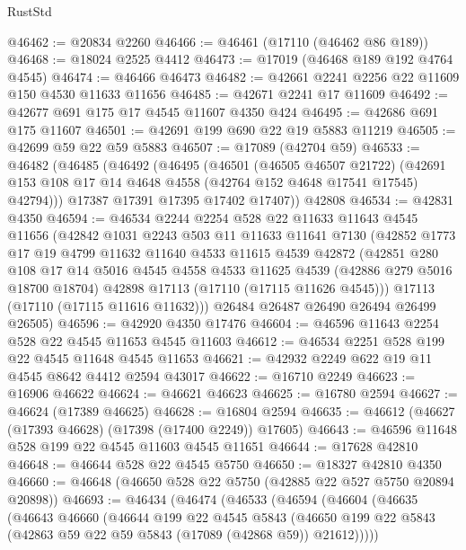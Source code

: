 \begin{lexlean}{RustStd}
\begin{coremodule}
@46462 := @20834 @2260
@46466 := @46461 (@17110 (@46462 @86 @189))
@46468 := @18024 @2525 @4412
@46473 := @17019 (@46468 @189 @192 @4764 @4545)
@46474 := @46466 @46473
@46482 := @42661 @2241 @2256 @22 @11609 @150 @4530 @11633 @11656
@46485 := @42671 @2241 @17 @11609
@46492 := @42677 @691 @175 @17 @4545 @11607 @4350 @424
@46495 := @42686 @691 @175 @11607
@46501 := @42691 @199 @690 @22 @19 @5883 @11219
@46505 := @42699 @59 @22 @59 @5883
@46507 := @17089 (@42704 @59)
@46533 := @46482
    (@46485
      (@46492
        (@46495
          (@46501
            (@46505 @46507 @21722)
            (@42691 @153 @108 @17 @14 @4648 @4558 (@42764 @152 @4648 @17541 @17545) @42794)))
        @17387
        @17391
        @17395
        @17402
        @17407))
    @42808
@46534 := @42831 @4350
@46594 := @46534
    @2244
    @2254
    @528
    @22
    @11633
    @11643
    @4545
    @11656
    (@42842
      @1031
      @2243
      @503
      @11
      @11633
      @11641
      @7130
      (@42852
        @1773
        @17
        @19
        @4799
        @11632
        @11640
        @4533
        @11615
        @4539
        @42872
        (@42851
          @280
          @108
          @17
          @14
          @5016
          @4545
          @4558
          @4533
          @11625
          @4539
          (@42886 @279 @5016 @18700 @18704)
          @42898
          @17113
          (@17110 (@17115 @11626 @4545)))
        @17113
        (@17110 (@17115 @11616 @11632)))
      @26484
      @26487
      @26490
      @26494
      @26499
      @26505)
@46596 := @42920 @4350 @17476
@46604 := @46596 @11643 @2254 @528 @22 @4545 @11653 @4545 @11603
@46612 := @46534 @2251 @528 @199 @22 @4545 @11648 @4545 @11653
@46621 := @42932 @2249 @622 @19 @11 @4545 @8642 @4412 @2594 @43017
@46622 := @16710 @2249
@46623 := @16906 @46622
@46624 := @46621 @46623
@46625 := @16780 @2594
@46627 := @46624 (@17389 @46625)
@46628 := @16804 @2594
@46635 := @46612 (@46627 (@17393 @46628) (@17398 (@17400 @2249)) @17605)
@46643 := @46596 @11648 @528 @199 @22 @4545 @11603 @4545 @11651
@46644 := @17628 @42810
@46648 := @46644 @528 @22 @4545 @5750
@46650 := @18327 @42810 @4350
@46660 := @46648 (@46650 @528 @22 @5750 (@42885 @22 @527 @5750 @20894 @20898))
@46693 := @46434
    (@46474
      (@46533
        (@46594
          (@46604
            (@46635
              (@46643
                @46660
                (@46644
                  @199
                  @22
                  @4545
                  @5843
                  (@46650 @199 @22 @5843 (@42863 @59 @22 @59 @5843 (@17089 (@42868 @59)) @21612)))))

\end{coremodule}
\end{lexlean}
